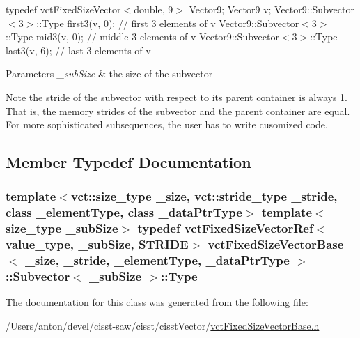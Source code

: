 typedef vct\+Fixed\+Size\+Vector$<$double, 9$>$ Vector9; Vector9 v; Vector9\+::\+Subvector$<$3$>$\+::\+Type first3(v, 0); // first 3 elements of v Vector9\+::\+Subvector$<$3$>$\+::\+Type mid3(v, 0); // middle 3 elements of v Vector9\+::\+Subvector$<$3$>$\+::\+Type last3(v, 6); // last 3 elements of v


\begin{DoxyParams}{Parameters}
{\em \+\_\+sub\+Size} & the size of the subvector\\
\hline
\end{DoxyParams}
\begin{DoxyNote}{Note}
the stride of the subvector with respect to its parent container is always 1. That is, the memory strides of the subvector and the parent container are equal. For more sophisticated subsequences, the user has to write cusomized code. 
\end{DoxyNote}


\subsection{Member Typedef Documentation}
\hypertarget{classvct_fixed_size_vector_base_1_1_subvector_a069ff7943ff217639b0dbb273d052647}{}
\subsubsection[{Type}]{\setlength{\rightskip}{0pt plus 5cm}template$<$vct\+::size\+\_\+type \+\_\+size, vct\+::stride\+\_\+type \+\_\+stride, class \+\_\+element\+Type, class \+\_\+data\+Ptr\+Type$>$ template$<$size\+\_\+type \+\_\+sub\+Size$>$ typedef {\bf vct\+Fixed\+Size\+Vector\+Ref}$<$value\+\_\+type, \+\_\+sub\+Size, {\bf S\+T\+R\+I\+D\+E}$>$ {\bf vct\+Fixed\+Size\+Vector\+Base}$<$ \+\_\+size, \+\_\+stride, \+\_\+element\+Type, \+\_\+data\+Ptr\+Type $>$\+::{\bf Subvector}$<$ \+\_\+sub\+Size $>$\+::{\bf Type}}\label{classvct_fixed_size_vector_base_1_1_subvector_a069ff7943ff217639b0dbb273d052647}


The documentation for this class was generated from the following file\+:\begin{DoxyCompactItemize}
\item 
/\+Users/anton/devel/cisst-\/saw/cisst/cisst\+Vector/\hyperlink{vct_fixed_size_vector_base_8h}{vct\+Fixed\+Size\+Vector\+Base.\+h}\end{DoxyCompactItemize}
